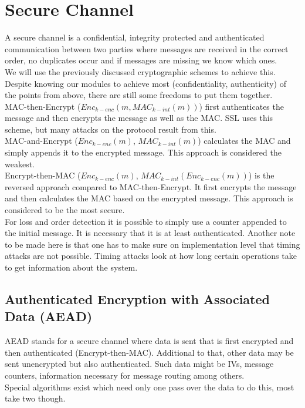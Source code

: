 
\section{Secure Channel}
A secure channel is a confidential, integrity protected and authenticated communication between two parties where messages are received in the correct order, no duplicates occur and if messages are missing we know which ones.\\

We will use the previously discussed cryptographic schemes to achieve this.
Despite knowing our modules to achieve most (confidentiality, authenticity) of the points from above, there are still some freedoms to put them together.\\
MAC-then-Encrypt ($Enc_{k-enc}(m,MAC_{k-int}(m))$) first authenticates the message and then encrypts the message as well as the MAC.
SSL uses this scheme, but many attacks on the protocol result from this.\\
MAC-and-Encrypt ($Enc_{k-enc}(m)$, $MAC_{k-int}(m)$) calculates the MAC and simply appends it to the encrypted message.
This approach is considered the weakest.\\
Encrypt-then-MAC ($Enc_{k-enc}(m)$, $MAC_{k-int}(Enc_{k-enc}(m))$) is the reversed approach compared to MAC-then-Encrypt.
It first encrypts the message and then calculates the MAC based on the encrypted message.
This approach is considered to be the most secure.\\
For loss and order detection it is possible to simply use a counter appended to the initial message.
It is necessary that it is at least authenticated.
Another note to be made here is that one has to make sure on implementation level that timing attacks are not possible.
Timing attacks look at how long certain operations take to get information about the system.

\subsection{Authenticated Encryption with Associated Data (AEAD)}
AEAD stands for a secure channel where data is sent that is first encrypted and then authenticated (Encrypt-then-MAC).
Additional to that, other data may be sent unencrypted but also authenticated.
Such data might be IVs, message counters, information necessary for message routing among others.\\
Special algorithms exist which need only one pass over the data to do this, most take two though.

